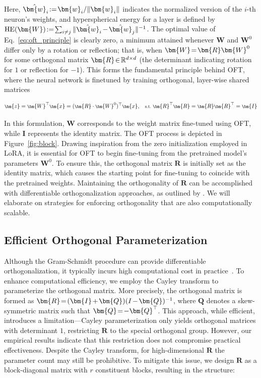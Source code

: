 Here, $\thickmuskip=2mu \medmuskip=2mu \hat{\bm{w}}_i:=\bm{w}_i/\|\bm{w}_i\|$ indicates the normalized version of the $i$-th neuron's weights, and hyperspherical energy for a layer is defined by $\thickmuskip=2mu \medmuskip=2mu \text{HE}(\bm{W}):= \sum_{i\neq j} \|\hat{\bm{w}}_i-\hat{\bm{w}}_j\|^{-1}$. The optimal value of Eq.~\eqref{eq:oft_principle} is clearly zero, a minimum attained whenever $\bm{W}$ and $\bm{W}^0$ differ only by a rotation or reflection; that is, when $\thickmuskip=2mu \medmuskip=2mu \bm{W}=\bm{R}\bm{W}^0$ for some orthogonal matrix $\thickmuskip=2mu \medmuskip=2mu \bm{R}\in\mathbb{R}^{d\times d}$ (the determinant indicating rotation for $1$ or reflection for $-1$). This forms the fundamental principle behind OFT, where the neural network is finetuned by training orthogonal, layer-wise shared matrices

\begin{equation}\label{eq:oft_general}
    \footnotesize
    \bm{z}=\bm{W}^\top\bm{x}=(\bm{R}\cdot\bm{W}^0)^\top\bm{x},~~~\text{s.t.}~\bm{R}^\top\bm{R}=\bm{R}\bm{R}^\top=\bm{I}
\end{equation}

In this formulation, $\bm{W}$ corresponds to the weight matrix fine-tuned using OFT, while $\bm{I}$ represents the identity matrix. The OFT process is depicted in Figure~\ref{fig:block}. Drawing inspiration from the zero initialization employed in LoRA, it is essential for OFT to begin fine-tuning from the pretrained model’s parameters $\bm{W}^0$. To ensure this, the orthogonal matrix $\bm{R}$ is initially set as the identity matrix, which causes the starting point for fine-tuning to coincide with the pretrained weights. Maintaining the orthogonality of $\bm{R}$ can be accomplished with differentiable orthogonalization approaches, as outlined by \cite{liu2021orthogonal,lezcano2019cheap}. We will elaborate on strategies for enforcing orthogonality that are also computationally scalable.

\subsection{Efficient Orthogonal Parameterization}\label{sect:eff_ortho}

Although the Gram-Schmidt procedure can provide differentiable orthogonalization, it typically incurs high computational cost in practice~\cite{liu2021orthogonal}. To enhance computational efficiency, we employ the Cayley transform to parameterize the orthogonal matrix. More precisely, the orthogonal matrix is formed as $\thickmuskip=2mu \medmuskip=2mu \bm{R}=(\bm{I}+\bm{Q})(I-\bm{Q})^{-1}$, where $\bm{Q}$ denotes a skew-symmetric matrix such that $\thickmuskip=2mu \medmuskip=2mu \bm{Q}=-\bm{Q}^\top$. This approach, while efficient, introduces a limitation—Cayley parameterization only yields orthogonal matrices with determinant $1$, restricting $\bm{R}$ to the special orthogonal group. However, our empirical results indicate that this restriction does not compromise practical effectiveness. Despite the Cayley transform, for high-dimensional $\bm{R}$ the parameter count may still be prohibitive. To mitigate this issue, we design $\bm{R}$ as a block-diagonal matrix with $r$ constituent blocks, resulting in the structure:

